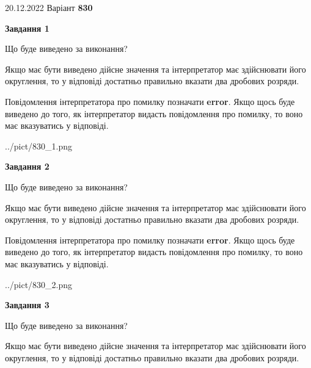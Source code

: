 \documentclass[12pt, ukrainian]{article}
\begin{document}
{20.12.2022 Варіант \No \textbf { 830 }\par}
{
\begin {Large}

{\begin {center}\textbf{Завдання 1}\end {center}}\par
Що буде виведено за виконання? \par

Якщо має бути виведено дійсне значення та інтерпретатор має здійснювати його округлення, 
то у відповіді достатньо правильно вказати два дробових розряди.

Повідомлення інтерпретатора про помилку позначати \textbf{error}.
Якщо щось буде виведено до того, як інтерпретатор видасть повідомлення про помилку, 
то воно має вказуватись у відповіді. \par

\begin{center}
	{../pict/830_1.png}
\end{center}
\newpage

{\begin {center}\textbf{Завдання 2}\end {center}}\par
Що буде виведено за виконання? \par

Якщо має бути виведено дійсне значення та інтерпретатор має здійснювати його округлення, 
то у відповіді достатньо правильно вказати два дробових розряди.

Повідомлення інтерпретатора про помилку позначати \textbf{error}.
Якщо щось буде виведено до того, як інтерпретатор видасть повідомлення про помилку, 
то воно має вказуватись у відповіді. \par

\begin{center}
	{../pict/830_2.png}
\end{center}
\newpage

{\begin {center}\textbf{Завдання 3}\end {center}}\par
Що буде виведено за виконання? \par

Якщо має бути виведено дійсне значення та інтерпретатор має здійснювати його округлення, 
то у відповіді достатньо правильно вказати два дробових розряди.


\end{Large}}
\end{document}
